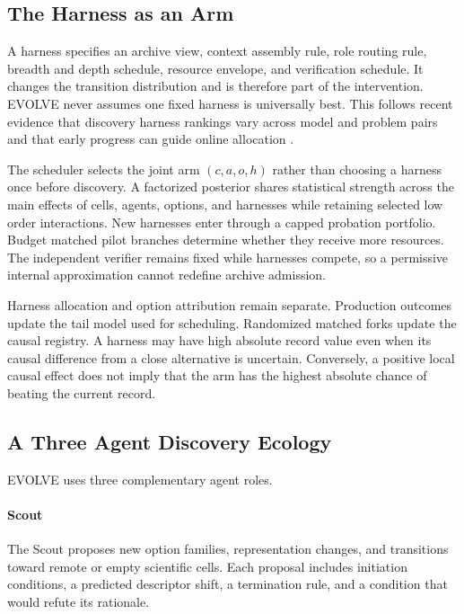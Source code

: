 \documentclass{article}
\begin{document}
\subsection{The Harness as an Arm}
\label{secharness}

A harness specifies an archive view, context assembly rule, role routing rule, breadth and depth schedule, resource envelope, and verification schedule. It changes the transition distribution and is therefore part of the intervention. EVOLVE never assumes one fixed harness is universally best. This follows recent evidence that discovery harness rankings vary across model and problem pairs and that early progress can guide online allocation \citep{gupta2026}.

The scheduler selects the joint arm $(c,a,o,h)$ rather than choosing a harness once before discovery. A factorized posterior shares statistical strength across the main effects of cells, agents, options, and harnesses while retaining selected low order interactions. New harnesses enter through a capped probation portfolio. Budget matched pilot branches determine whether they receive more resources. The independent verifier remains fixed while harnesses compete, so a permissive internal approximation cannot redefine archive admission.

Harness allocation and option attribution remain separate. Production outcomes update the tail model used for scheduling. Randomized matched forks update the causal registry. A harness may have high absolute record value even when its causal difference from a close alternative is uncertain. Conversely, a positive local causal effect does not imply that the arm has the highest absolute chance of beating the current record.

\subsection{A Three Agent Discovery Ecology}
\label{secagents}

EVOLVE uses three complementary agent roles.

\paragraph{Scout}
The Scout proposes new option families, representation changes, and transitions toward remote or empty scientific cells. Each proposal includes initiation conditions, a predicted descriptor shift, a termination rule, and a condition that would refute its rationale.
\end{document}
